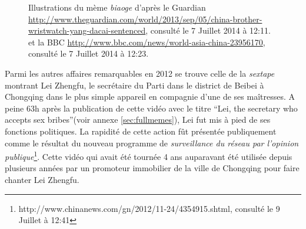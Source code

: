 \begin{figure}[htbp]
    \hspace{\fill}%
    \hspace{\fill}%
    \hspace{\fill}%
    \caption{ 
      Illustrations du mème \textit{biaoge} d'après le Guardian \url{http://www.theguardian.com/world/2013/sep/05/china-brother-wristwatch-yang-dacai-sentenced}, consulté le 7 Juillet 2014 à 12:11. et la BBC \url{http://www.bbc.com/news/world-asia-china-23956170}, consulté le 7 Juillet 2014 à 12:23.
    }
\end{figure}

Parmi les autres affaires remarquables en 2012 se trouve celle de la \textit{sextape} montrant Lei Zhengfu, le secrétaire du Parti dans le district de Beibei à Chongqing dans le plus simple appareil en compagnie d'une de ses maîtresses. A peine 63h après la publication de cette vidéo avec le titre ``Lei, the secretary who accepts sex bribes''(voir annexe \ref{sec:fullmemes}), Lei fut mis à pied de ses fonctions politiques. La rapidité de cette action fût présentée publiquement comme le résultat du nouveau programme de \textit{surveillance du réseau par l'opinion publique}\footnote{http://www.chinanews.com/gn/2012/11-24/4354915.shtml, consulté le 9 Juillet à 12:41}. Cette vidéo qui avait été tournée 4 ans auparavant été utilisée depuis plusieurs années par un promoteur immobilier de la ville de Chongqing pour faire chanter Lei Zhengfu. 


